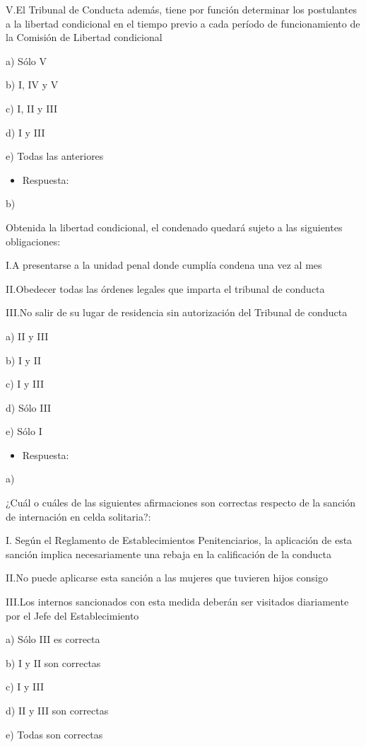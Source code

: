 \documentclass[letterpaper, 11pt]{article}
\begin{document}
V.El Tribunal de Conducta además, tiene por función determinar los postulantes a la
libertad condicional en el tiempo previo a cada período de funcionamiento de la
Comisión de Libertad condicional

a) Sólo V

b) I, IV y V

c) I, II y III

d) I y III

e) Todas las anteriores

\begin{itemize}
\item Respuesta:
\end{itemize}
b)

Obtenida la libertad condicional, el condenado quedará sujeto a las siguientes
obligaciones:

I.A presentarse a la unidad penal donde cumplía condena una vez al mes

II.Obedecer todas las órdenes legales que imparta el tribunal de conducta

III.No salir de su lugar de residencia sin autorización del Tribunal de conducta

a) II y III

b) I y II

c) I y III

d) Sólo III

e) Sólo I

\begin{itemize}
\item Respuesta:
\end{itemize}
a)


¿Cuál o cuáles de las siguientes afirmaciones son correctas respecto de la
sanción de internación en celda solitaria?:

I. Según el Reglamento de Establecimientos Penitenciarios, la aplicación de esta
sanción implica necesariamente una rebaja en la calificación de la conducta

II.No puede aplicarse esta sanción a las mujeres que tuvieren hijos consigo

III.Los internos sancionados con esta medida deberán ser visitados diariamente por el
Jefe del Establecimiento

a) Sólo III es correcta

b) I y II son correctas

c) I y III

d) II y III son correctas

e) Todas son correctas
\end{document}
